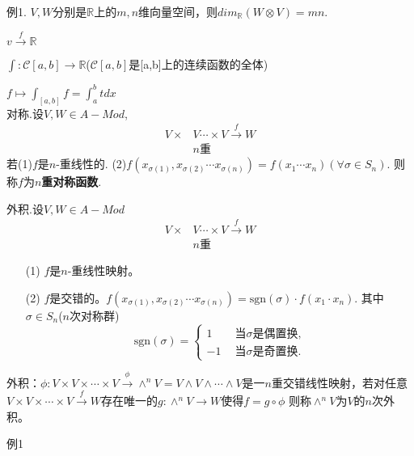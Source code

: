 \documentclass[UTF8]{article}
\begin{document}
例1. $V,W$分别是$\mathbb{R}$上的$m,n$维向量空间，则$dim_\mathbb{R}(W\otimes V)=mn.$

$v \stackrel{f}{\longrightarrow} \mathbb{R}$

$\int:\mathscr{C}[a, b]  \longrightarrow \mathbb{R}$($\mathscr{C}[a, b]$是[a,b]上的连续函数的全体)

$f\mapsto \int_{[a, b]} f=\int_{a}^{b} t d x$\\


\noindent 对称.设$V,W\in A-Mod$,\\
$$\begin{aligned}
V\times &V\cdots\times V\stackrel{f}{\longrightarrow}W\\
&n\text{重}
\end{aligned}$$
若(1)$f$是$n$-重线性的.
(2)$f(x_{\sigma(1)},x_{\sigma(2)}\cdots x_{\sigma(n)})=f(x_1\cdots x_n)(\forall \sigma\in S_n).$
则称$f$为\textbf{$n$重对称函数}.


外积.设$V,W\in A-Mod$\\
$$\begin{aligned}
V\times &V\cdots\times V\stackrel{f}{\longrightarrow}W\\
&n\text{重}
\end{aligned}$$
\begin{itemize}
	\item[(1)] $f$是$n$-重线性映射。
	\item[(2)] $f$是交错的。$f(x_{\sigma(1)},x_{\sigma(2)}\cdots x_{\sigma(n)})=\mathrm{sgn}(\sigma)\cdot f(x_1\cdot x_n)$.
	其中$\sigma\in S_n$($n$次对称群)\\
	$$\mathrm{sgn}(\sigma)=\left\{\begin{array}{l}
	1\qquad\text{当}\sigma\text{是偶置换,}\\
	-1~\quad\text{当}\sigma\text{是奇置换.}
	\end{array}\right.$$
\end{itemize}
外积：$\phi:V\times V\times \cdots\times V\xrightarrow{\phi}\wedge^{n}V=V\wedge V\wedge \cdots\wedge V$是一$n$重交错线性映射，若对任意$V\times V\times \cdots\times V\xrightarrow{f}W$存在唯一的$g:\wedge^{n}V\longrightarrow W$使得$f=g\circ \phi$
则称$\wedge^{n}V$为$V$的$n$次外积。

例1
\end{document}
